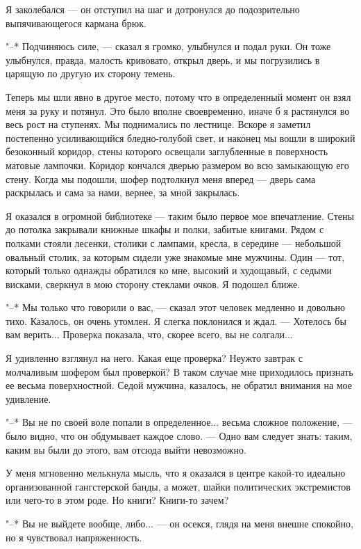 Я заколебался --- он  отступил  на  шаг  и  дотронулся  до  подозрительно
выпячивающегося кармана брюк.

"--* Подчиняюсь силе, --- сказал я громко, улыбнулся и подал руки.  Он  тоже
улыбнулся, правда, малость кривовато, открыл дверь,  и  мы  погрузились  в
царящую по другую их сторону темень.

Теперь мы шли явно в другое место, потому что в определенный момент  он
взял меня за руку и потянул. Это  было  вполне  своевременно,  иначе  б  я
растянулся во весь рост на ступенях. Мы поднимались по лестнице. Вскоре  я
заметил постепенно усиливающийся бледно-голубой свет, и наконец мы вошли в
широкий  безоконный  коридор,  стены  которого  освещали  заглубленные   в
поверхность матовые лампочки. Коридор  кончался  дверью  размером  во  всю
замыкающую его стену. Когда мы подошли, шофер  подтолкнул  меня  вперед  ---
дверь сама раскрылась и сама за нами, вернее, за мной закрылась.

Я оказался в огромной библиотеке --- таким было первое  мое  впечатление.
Стены до потолка закрывали книжные шкафы и полки, забитые книгами. Рядом с
полками стояли лесенки, столики с лампами, кресла, в середине ---  небольшой
овальный столик, за которым сидели уже знакомые мне мужчины. Один  ---  тот,
который только однажды обратился ко мне, высокий  и  худощавый,  с  седыми
висками, сверкнул в мою сторону стеклами очков. Я подошел ближе.

"--* Мы только что говорили о  вас,  ---  сказал  этот  человек  медленно  и
довольно тихо. Казалось, он очень утомлен. Я слегка поклонился и  ждал.  ---
Хотелось бы вам верить... Проверка показала,  что,  скорее  всего,  вы  не
солгали...

Я удивленно взглянул на него. Какая  еще  проверка?  Неужто  завтрак  с
молчаливым шофером был проверкой? В таком случае мне приходилось  признать
ее весьма поверхностной. Седой мужчина, казалось, не обратил  внимания  на
мое удивление.

"--*  Вы  не  по  своей  воле  попали  в  определенное...  весьма  сложное
положение, --- было видно, что  он  обдумывает  каждое  слово.  ---  Одно  вам
следует знать: таким, каким вы были до этого, вам отсюда выйти невозможно.

У меня мгновенно мелькнула мысль, что  я  оказался  в  центре  какой-то
идеально организованной гангстерской банды, а  может,  шайки  политических
экстремистов или чего-то в этом роде. Но книги? Книги-то зачем?

"--* Вы не выйдете вообще, либо... ---  он  осекся,  глядя  на  меня  внешне
спокойно, но я чувствовал напряженность.


